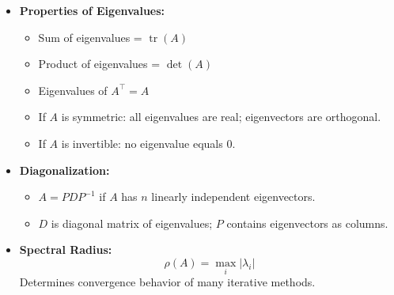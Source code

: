 \documentclass[9pt,letterpaper]{article}
\begin{document}
\begin{multicols*}{3}
\begin{itemize}
    \item \textbf{Properties of Eigenvalues:}
      \begin{itemize}
        \item Sum of eigenvalues = $\operatorname{tr}(A)$
        \item Product of eigenvalues = $\det(A)$
        \item Eigenvalues of $A^\top = A$
        \item If $A$ is symmetric: all eigenvalues are real; eigenvectors are orthogonal.
        \item If $A$ is invertible: no eigenvalue equals 0.
      \end{itemize}

    \item \textbf{Diagonalization:}
      \begin{itemize}
        \item $A = PDP^{-1}$ if $A$ has $n$ linearly independent eigenvectors.
        \item $D$ is diagonal matrix of eigenvalues; $P$ contains eigenvectors as columns.
      \end{itemize}

    \item \textbf{Spectral Radius:}
      \[
        \rho(A) = \max_i |\lambda_i|
      \]
      Determines convergence behavior of many iterative methods.
  \end{itemize}

\end{multicols*}
\end{document}
